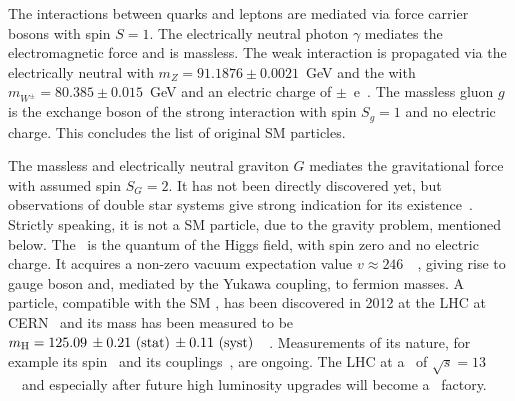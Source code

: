The interactions between quarks and leptons are mediated via force carrier bosons with spin $S=1$. The electrically neutral photon $\gamma$ mediates the electromagnetic force and is massless. The weak interaction is propagated via  the electrically neutral \Zboson with $m_Z=91.1876\pm 0.0021$~GeV and the  with $m_{W^\pm}=80.385\pm0.015$~GeV and an electric charge of $\pm$~e~\cite{PDG2014}. The massless gluon $g$ is the exchange boson of the strong interaction with spin $S_g=1$ and no electric charge. This concludes the list of original \gls{SM} particles. 


The massless and electrically neutral graviton $G$ mediates the gravitational force with assumed spin $S_G=2$. It has not been directly discovered yet, but observations of double star systems give strong indication for its existence~\cite{Hulse:1974eb}. Strictly speaking, it is not a \gls{SM} particle, due to the gravity problem, mentioned below.
The \Hboson\ is the quantum of the Higgs field, with spin zero and no electric charge. It acquires a non-zero vacuum expectation value $v \approx 246$~\GeV~\cite{PDG2014}, giving rise to gauge boson and, mediated by the Yukawa coupling, to fermion masses. A particle, compatible with the \gls{SM} \Hboson, has been discovered in 2012 at the \gls{LHC} at \gls{CERN}~\cite{Aad20121,Chatrchyan2013} and its mass has been measured to be $m_{\mathrm{H}}=125.09\,\pm 0.21~\mathrm{(stat)}\,\pm 0.11~\mathrm{(syst)}$~\GeV~\cite{Aad:2015zhl}. 
%
Measurements of its nature, for example its spin~\cite{tagkey2013120} and its couplings~\cite{tagkey201388}, are ongoing. The \gls{LHC} at a \cme\ of $\sqrt{s}=13$~\TeV\ and especially after future high luminosity upgrades will become a \Hboson\ factory. 

